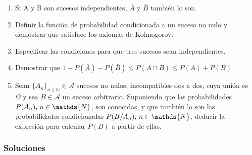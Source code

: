\documentclass[fleqn]{article}
\def\N{\mathds{N}}
\begin{document}
\begin{enumerate}
                        \begin{enumerate}
                                \item Si A y B son sucesos independientes, $\bar{A}$ y $\bar{B}$ también lo son.\\
                                \item Definir la función de probabilidad condicionada a un suceso no nulo y demostrar 
                                        que satisface los axiomas de Kolmogorov.\\
                                \item Especificar las condiciones para que tres sucesos sean independientes.\\
                                \item Demostrar que $1 - P(\bar{A}) - P(\bar{B}) \leq P(A \cap B) \leq P(A) + P(B)$\\
                                \item Sean $\{A_n\}_{n\in \N} \in \mathcal{A}$ sucesos no nulos, incompatibles dos a dos, cuya unión es $\Omega$ y sea 
                                        $B \in \mathcal{A}$ un suceso arbitrario. Suponiendo que las probabilidades $P(A_n), \thinspace n \in \N$, son conocidas,
                                        y que también lo son las probabilidades condicionadas $P(B/A_n), \thinspace n \in \N$, deducir la expresión para calcular 
                                        $P(B)$ a partir de ellas.
                        \end{enumerate}

                
                \newpage

                \subsubsection{Soluciones}
                        

\end{enumerate}
\end{document}
